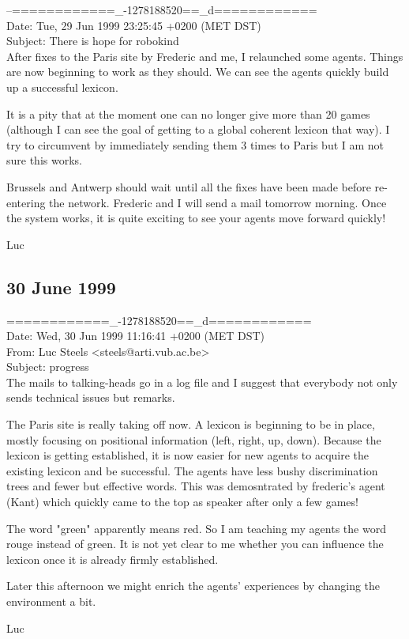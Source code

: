 \begin{mail}
--============\_-1278188520==\_d============\\
Date: Tue, 29 Jun 1999 23:25:45 +0200 (MET DST)\\
Subject: There is hope for robokind \\

After fixes to the Paris site by Frederic and me, I relaunched some agents. 
Things are now beginning to work as they should. We can see the
agents quickly build up a successful lexicon.

It is a pity that at the moment one can no longer give more 
than 20 games (although I can see the goal of getting to a global 
coherent lexicon that way). I try to circumvent by immediately
sending them 3 times to Paris but I am not sure this works.

Brussels and Antwerp should wait until all the fixes have been made 
before re-entering the network. Frederic and I will send a mail tomorrow
morning. Once the system works, it is quite exciting to see your agents move 
forward quickly!

Luc
\end{mail}

\subsection*{30 June 1999} 


\begin{mail}
============\_-1278188520==\_d============\\
Date: Wed, 30 Jun 1999 11:16:41 +0200 (MET DST)\\
From: Luc Steels <steels@arti.vub.ac.be>\\
Subject: progress \\

The mails to talking-heads go in a log file and I suggest that everybody not 
only sends technical issues but remarks.

The Paris site is really taking off now. A lexicon is beginning to 
be in place, mostly focusing on positional information (left, right, up, 
down). Because the lexicon is getting established, it is now easier for
new agents to acquire the existing lexicon and be successful. The agents have less
bushy discrimination trees and fewer but effective words. This was demosntrated
by frederic's agent (Kant) which quickly came to the top as speaker after only a
few games!

The word "green" apparently means red. So I am teaching my agents the word
rouge instead of green. It is not yet clear to me whether you can influence 
the lexicon once it is already firmly established.

Later this afternoon we might enrich the agents' experiences by changing the
environment a bit.

Luc
\end{mail}

